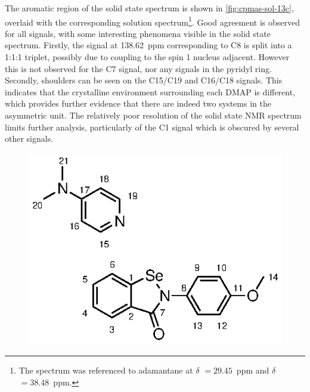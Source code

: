 \begin{refsection}
The aromatic region of the solid state  spectrum is shown in \cref{fig:cpmas-sol-13c}, overlaid with the corresponding solution spectrum\footnote{The  spectrum was referenced to adamantane at $ \delta $ $= 29.45$~ppm and $ \delta $ $= 38.48$~ppm.\autocite{Morcombe2003}}.
Good agreement is observed for all signals, with some interesting phenomena visible in the solid state spectrum.
Firstly, the signal at 138.62~ppm corresponding to C8 is split into a 1:1:1 triplet, possibly due to coupling to the spin 1  nucleus adjacent.
However this is not observed for the C7 signal, nor any signals in the pyridyl ring.
Secondly, shoulders can be seen on the C15/C19 and C16/C18 signals.
This indicates that the crystalline environment surrounding each DMAP is different, which provides further evidence that there are indeed two systems in the asymmetric unit.
The relatively poor resolution of the solid state  NMR spectrum limits further analysis, particularly of the C1 signal which is obscured by several other signals.

\begin{figure}
    \centering
    \includegraphics[scale=0.74]{Figures/numbering.eps}


\end{figure}
\end{refsection}
